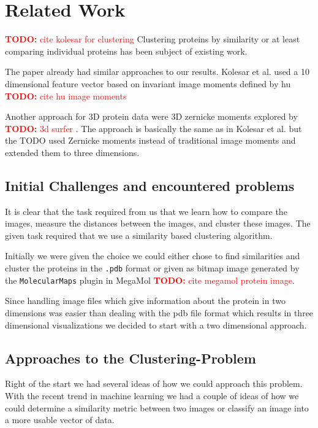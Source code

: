 \documentclass[journal]{vgtc}       %
\newcommand{\todo}[1]{\textcolor{red}{\textbf{TODO:} #1}}
\begin{document}
\section{Related Work}\label{sec:relatedWork}

\todo{cite kolesar for clustering}
Clustering proteins by similarity or at least comparing individual proteins has been subject of existing work.

The paper \cite{kolesar} already had similar approaches to our results. Kolesar et al. used a 10 dimensional feature vector based on invariant image moments defined by hu \todo{cite hu image moments}

Another approach for 3D protein data were 3D zernicke moments explored by \todo{3d surfer }. The approach is basically the same as in Kolesar et al. but the TODO used Zernicke moments instead of traditional image moments and extended them to three dimensions.



\subsection{Initial Challenges and encountered problems}

It is clear that the task required from us that we learn how to compare the images, measure the distances between the images, and cluster these images.
The given task required that we use a similarity based clustering algorithm.

Initially we were given the choice we could either chose to find similarities and cluster the proteins in the \verb|.pdb| format or given as bitmap image generated by the \verb|MolecularMaps| plugin in MegaMol \todo{cite megamol protein image}.

Since handling image files which give information about the protein in two dimensions was easier than dealing with the pdb file format which results in three dimensional visualizations we decided to start with a two dimensional approach.





\subsection{Approaches to the Clustering-Problem}

Right of the start we had several ideas of how we could approach this problem. 
With the recent trend in machine learning we had a couple of ideas of how we could determine a similarity metric between two images or classify an image into a more usable vector of data.
\end{document}
